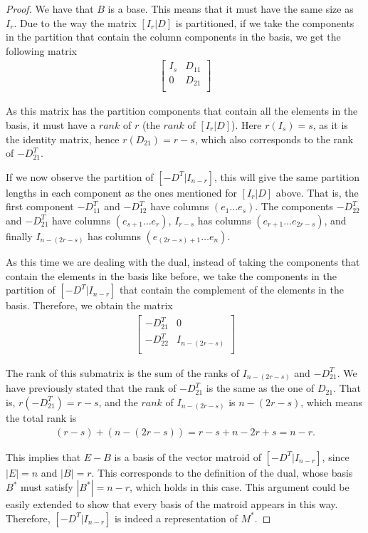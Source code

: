 \begin{proof}
    We have that $B$ is a base. This means that it must have the same size as $I_r$. Due to the way the matrix $[I_r|D]$ is partitioned, if we take the components in the partition that contain the column components in the basis, we get the following matrix
        \begin{align*}
        \begin{bmatrix}
        I_s & D_{11}\\
        0 & D_{21}\\
        \end{bmatrix}
        \end{align*}

    As this matrix has the partition components that contain all the elements in the basis, it must have a $rank$ of $r$ (the $rank$ of $[I_r|D]$). Here $r(I_s) = s$, as it is the identity matrix, hence $r(D_{21})=r-s$, which also corresponds to the rank of $-D_21^T$.
    
    If we now observe the partition of $[-D^T|I_{n-r}]$, this will give the same partition lengths in each component as the ones mentioned for $[I_r|D]$ above. That is, the first component $-D_{11}^T$ and $-D_{12}^T$ have columns $(e_1 \dots e_s)$. The components $-D_{22}^T$ and $-D_{21}^T$ have columns $(e_{s+1} \dots e_r)$, $I_{r-s}$ has columns $(e_{r+1} \dots e_{2r-s})$, and finally $ I_{n-(2r-s)}$ has columns $(e_{(2r-s)+1} \dots e_n)$.

    As this time we are dealing with the dual, instead of taking the components that contain the elements in the basis like before, we take the components in the partition of $[-D^T|I_{n-r}]$ that contain the complement of the elements in the basis. Therefore, we obtain the matrix
    \begin{align*}
        \begin{bmatrix}
        -D_{21}^T & 0\\
        -D_{22}^T & I_{n-(2r-s)}\\
        \end{bmatrix}
    \end{align*}

   The rank of this submatrix is the sum of the ranks of $I_{n-(2r-s)}$ and $-D_{21}^T$. We have previously stated that the rank of $-D_{21}^T$ is the same as the one of $D_{21}$. That is, $r(-D_{21}^T)= r-s$, and the $rank$ of $I_{n-(2r-s)}$ is $n-(2r-s)$, which means the total rank is 
   \begin{align*}
    (r-s)+(n-(2r-s))= r-s+n-2r+s = n-r.
   \end{align*}

    This implies that $E-B$ is a basis of the vector matroid of $[-D^T|I_{n-r}]$, since $|E|= n$ and $|B|= r$. This corresponds to the definition of the dual, whose basis $B^*$ must satisfy $|B^*|= n-r$, which holds in this case. This argument could be easily extended to show that every basis of the matroid appears in this way. Therefore, $[-D^T|I_{n-r}]$ is indeed a representation of $M^*$.
\end{proof}

